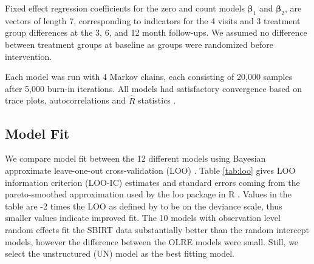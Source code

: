 \documentclass[12pt]{article}
\let\proglang=\textsf \let\code=\texttt
\begin{document}
Fixed effect regression coefficients for the zero and count models $\bm{\beta}_{1}$ and $\bm{\beta}_{2}$, are vectors of length 7, corresponding to indicators for the 4 visits and 3 treatment group differences at the 3, 6, and 12 month follow-ups. We assumed no difference between treatment groups at baseline as groups were randomized before intervention.

Each model was run with 4 Markov chains, each consisting of 20,000 samples after 5,000 burn-in iterations. All models had satisfactory convergence based on trace plots, autocorrelations and $\hat{R}$ statistics \cite{gelman1992inference}.

\subsection{Model Fit}
We compare model fit between the 12 different models using Bayesian approximate leave-one-out cross-validation (LOO) \citep{vehtari2017practical}. Table \ref{tab:loo} gives LOO information criterion (LOO-IC) estimates and standard errors coming from the pareto-smoothed approximation used by the \proglang{loo} package in R \citep{loopackage}. Values in the table are -2 times the LOO as defined by \cite{vehtari2017practical} to be on the deviance scale, thus smaller values indicate improved fit. The 10 models with observation level random effects fit the SBIRT data substantially better than the random intercept models, however the difference between the OLRE models were small. Still, we select the unstructured (UN) model as the best fitting model. 

\end{document}
